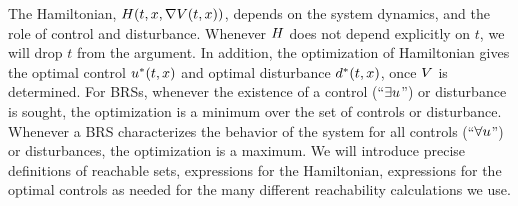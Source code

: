 The Hamiltonian, $H(t, x, \nabla V(t,x))$, depends on the system dynamics, and the role of control and disturbance. Whenever $H$ does not depend explicitly on $t$, we will drop $t$ from the argument. In addition, the optimization of Hamiltonian gives the optimal control $u^*(t, x)$ and optimal disturbance $d^*(t, x)$, once $V$ is determined. For BRSs, whenever the existence of a control (``$\exists u$'') or disturbance is sought, the optimization is a minimum over the set of controls or disturbance. Whenever a BRS characterizes the behavior of the system for all controls (``$\forall u$'') or disturbances, the optimization is a maximum. We will introduce precise definitions of reachable sets, expressions for the Hamiltonian, expressions for the optimal controls as needed for the many different reachability calculations we use. %
%
%
%
%
%
%
